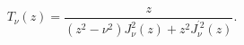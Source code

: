 \begin{equation}
T_{\nu }(z)=\frac{z}{(z^{2}-\nu ^{2})J_{\nu }^{2}(z)+z^{2}J_{\nu
}^{^{\prime }2}(z)}.  \label{teka}
\end{equation}

